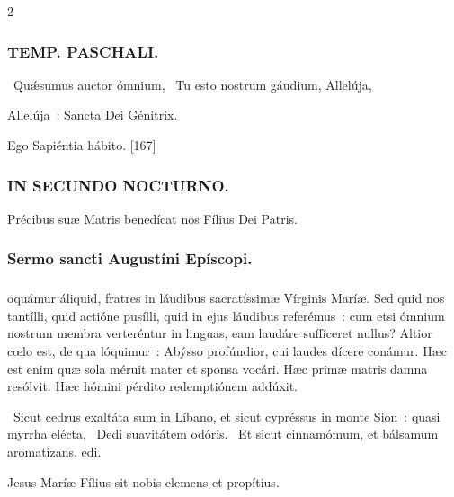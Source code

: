 \documentclass[9pt,twoside]{extarticle}
\begin{document}
\begin{multicols}{2}
\subsubsection*{\center \textsc{TEMP. PASCHALI.}}
\begin{tightlist}{}
\item {}~Quǽsumus auctor ómnium, ~Tu esto nostrum gáudium,  Allelúja,  
\item {} Allelúja~: Sancta Dei Génitrix.
\item {} Ego Sapiéntia hábito. [167]
\end{tightlist}

\subsubsection*{\center \textsc{IN SECUNDO NOCTURNO.}}
\begin{tightlist}{}
\item {\small {} Précibus suæ Matris benedícat nos Fílius Dei Patris.}
\end{tightlist}
\subsubsection*{\center Sermo sancti Augustíni Epíscopi.}
\subsubsection*{\center {}}
oquámur áliquid, fratres in láudibus sacratíssimæ Vírginis Maríæ. Sed quid nos tantílli, quid actióne pusílli, quid in ejus láudibus referémus~: cum etsi ómnium nostrum membra verteréntur in linguas, eam laudáre suffíceret nullus? Altior cœlo est, de qua lóquimur~: Abýsso profúndior, cui laudes dícere conámur. Hæc est enim quæ sola méruit mater et sponsa vocári. Hæc primæ matris damna resólvit. Hæc hómini pérdito redemptiónem addúxit.

\begin{tightlist}{}
\item {}~Sicut cedrus exaltáta sum in Líbano, et sicut cypréssus in monte Sion~: quasi myrrha elécta, \textred{*}~Dedi suavitátem odóris.
~Et sicut cinnamómum, et bálsamum aromatízans. edi.
\item {\small {} Jesus Maríæ Fílius sit nobis clemens et propítius.}
\end{tightlist}


\end{multicols}
\end{document}
